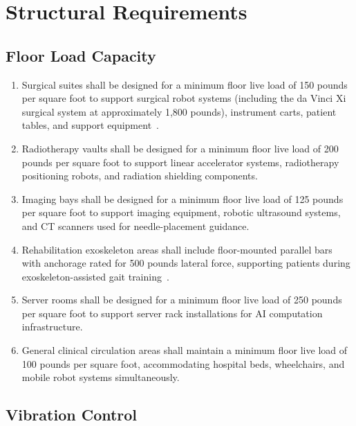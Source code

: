 \documentclass[11pt,letterpaper]{article}
\begin{document}
\section{Structural Requirements}

\subsection{Floor Load Capacity}

\begin{enumerate}[label=(\alph*)]
\item Surgical suites shall be designed for a minimum floor live load of 150
  pounds per square foot to support surgical robot systems (including the
  da Vinci Xi surgical system at approximately 1,800 pounds), instrument carts,
  patient tables, and support equipment~\cite{patientinstructions2026}.

\item Radiotherapy vaults shall be designed for a minimum floor live load of
  200 pounds per square foot to support linear accelerator systems,
  radiotherapy positioning robots, and radiation shielding components.

\item Imaging bays shall be designed for a minimum floor live load of 125
  pounds per square foot to support imaging equipment, robotic ultrasound
  systems, and CT scanners used for needle-placement guidance.

\item Rehabilitation exoskeleton areas shall include floor-mounted parallel
  bars with anchorage rated for 500 pounds lateral force, supporting patients
  during exoskeleton-assisted gait
  training~\cite{patientinstructions2026}.

\item Server rooms shall be designed for a minimum floor live load of 250
  pounds per square foot to support server rack installations for AI
  computation infrastructure.

\item General clinical circulation areas shall maintain a minimum floor live
  load of 100 pounds per square foot, accommodating hospital beds,
  wheelchairs, and mobile robot systems simultaneously.
\end{enumerate}

\subsection{Vibration Control}
\end{document}
